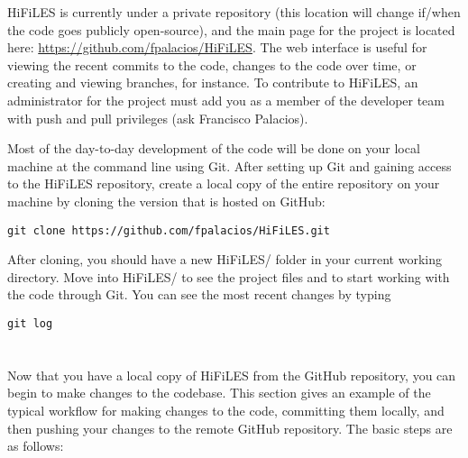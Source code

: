 \documentclass[letter,10pt]{article}
\newcommand*{\TitleFont}{%
      \usefont{\encodingdefault}{\rmdefault}{b}{n}%
      \fontsize{10}{20}%
      \selectfont}
\begin{document}
HiFiLES is currently under a private repository (this location will change if/when the code goes publicly open-source), and the main page for the project is located here: \url{https://github.com/fpalacios/HiFiLES}. The web interface is useful for viewing the recent commits to the code, changes to the code over time, or creating and viewing branches, for instance. To contribute to HiFiLES, an administrator for the project must add you as a member of the developer team with push and pull privileges (ask Francisco Palacios). 

Most of the day-to-day development of the code will be done on your local machine at the command line using Git. After setting up Git and gaining access to the HiFiLES repository, create a local copy of the entire repository on your machine by cloning the version that is hosted on GitHub:
\begin{verbatim}
git clone https://github.com/fpalacios/HiFiLES.git
\end{verbatim}
After cloning, you should have a new HiFiLES/ folder in your current working directory. Move into HiFiLES/ to see the project files and to start working with the code through Git. You can see the most recent changes by typing
\begin{verbatim}
git log
\end{verbatim}

\section*{\TitleFont{Typical Workflow with Git}}

Now that you have a local copy of HiFiLES from the GitHub repository, you can begin to make changes to the codebase. This section gives an example of the typical workflow for making changes to the code, committing them locally, and then pushing your changes to the remote GitHub repository. The basic steps are as follows:
\end{document}
